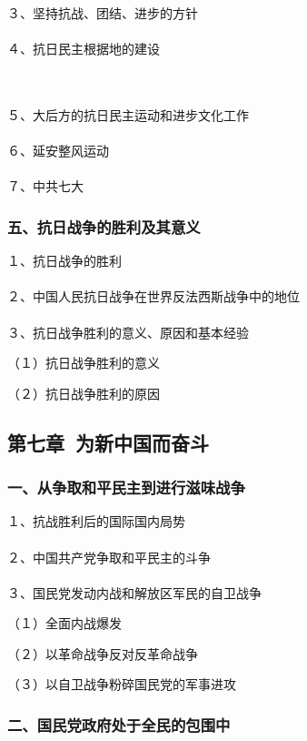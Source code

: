 \documentclass{ctexart}
\begin{document}
３、坚持抗战、团结、进步的方针
\\\\

４、抗日民主根据地的建设

\\\\
５、大后方的抗日民主运动和进步文化工作
\\\\

６、延安整风运动
\\\\

７、中共七大

\subsubsection{五、抗日战争的胜利及其意义}

１、抗日战争的胜利
\\\\

２、中国人民抗日战争在世界反法西斯战争中的地位
\\\\

３、抗日战争胜利的意义、原因和基本经验

（１）抗日战争胜利的意义

（２）抗日战争胜利的原因



\subsection{第七章\ 为新中国而奋斗}

\subsubsection{一、从争取和平民主到进行滋味战争}

１、抗战胜利后的国际国内局势
\\\\

２、中国共产党争取和平民主的斗争
\\\\

３、国民党发动内战和解放区军民的自卫战争

（１）全面内战爆发

（２）以革命战争反对反革命战争

（３）以自卫战争粉碎国民党的军事进攻

\subsubsection{二、国民党政府处于全民的包围中}
\end{document}
